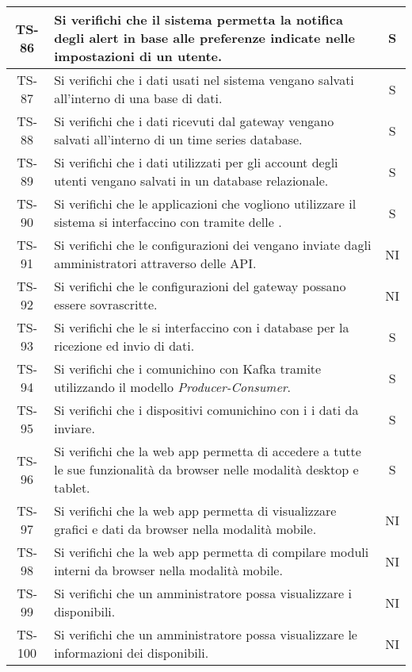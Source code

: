 \begin{center}
\begin{longtable}{|c|p{10cm}|c|}
			 \hline
			 TS-86 & Si verifichi che il sistema permetta la notifica degli alert in base alle preferenze indicate nelle impostazioni di un utente. & S \\
			 \hline
			 TS-87 & Si verifichi che i dati usati nel sistema vengano salvati all'interno di una base di dati. & S \\
			 \hline
			 TS-88 & Si verifichi che i dati ricevuti dal gateway vengano salvati all'interno di un time series database. & S \\
			 \hline
			 TS-89 & Si verifichi che i dati utilizzati per gli account degli utenti vengano salvati in un database relazionale. & S \\
			 \hline
			 TS-90 & Si verifichi che le applicazioni che vogliono utilizzare il sistema si interfaccino con \glock{Kafka} tramite delle \glock{API}. & S \\
			 \hline
			 TS-91 & Si verifichi che le configurazioni dei \glock{gateway} vengano inviate dagli amministratori attraverso delle API. & NI \\
			 \hline
			 TS-92 & Si verifichi che le configurazioni del gateway possano essere sovrascritte. & NI \\
			 \hline
			 TS-93 & Si verifichi che le \glock{API} si interfaccino con i database per la ricezione ed invio di dati. & S \\
			 \hline
			 TS-94 & Si verifichi che i \glock{gateway} comunichino con Kafka tramite \glock{topic} utilizzando il modello \textit{Producer-Consumer}. & S \\
			 \hline
			 TS-95 & Si verifichi che i dispositivi comunichino con i \glock{gateway} i dati da inviare. & S \\
			 \hline
			 TS-96 & Si verifichi che la web app permetta di accedere a tutte le sue funzionalità da browser nelle modalità desktop e tablet. & S \\
			 \hline
			 TS-97 & Si verifichi che la web app permetta di visualizzare grafici e dati da browser nella modalità mobile. & NI \\
			 \hline
			 TS-98 & Si verifichi che la web app permetta di compilare moduli interni da browser nella modalità mobile. & NI \\
			 \hline
			 TS-99 & Si verifichi che un amministratore possa visualizzare i \glock{gateway} disponibili. & NI \\
			 \hline
			 TS-100 & Si verifichi che un amministratore possa visualizzare le informazioni dei \glock{gateway} disponibili. & NI \\

\end{longtable}
\end{center}
